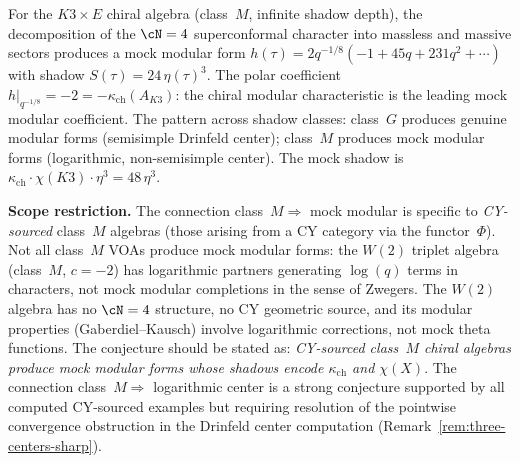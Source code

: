 \begin{remark}
\label{rem:class-m-mock-modular}
For the $K3 \times E$ chiral algebra (class~$M$, infinite shadow depth), the decomposition of the $\cN = 4$ superconformal character into massless and massive sectors produces a mock modular form $h(\tau) = 2q^{-1/8}(-1 + 45q + 231q^2 + \cdots)$ with shadow $S(\tau) = 24\,\eta(\tau)^3$. The polar coefficient $h|_{q^{-1/8}} = -2 = -\kappa_{\mathrm{ch}}(A_{K3})$: the chiral modular characteristic is the leading mock modular coefficient. The pattern across shadow classes: class~$G$ produces genuine modular forms (semisimple Drinfeld center); class~$M$ produces mock modular forms (logarithmic, non-semisimple center). The mock shadow is $\kappa_{\mathrm{ch}} \cdot \chi(K3) \cdot \eta^3 = 48\,\eta^3$.

\medskip\noindent
\textbf{Scope restriction.} The connection class~$M \Longrightarrow$ mock modular is specific to \emph{CY-sourced} class~$M$ algebras (those arising from a CY category via the functor~$\Phi$). Not all class~$M$ VOAs produce mock modular forms: the $W(2)$ triplet algebra (class~$M$, $c = -2$) has logarithmic partners generating $\log(q)$ terms in characters, not mock modular completions in the sense of Zwegers. The $W(2)$ algebra has no $\cN = 4$ structure, no CY geometric source, and its modular properties (Gaberdiel--Kausch) involve logarithmic corrections, not mock theta functions. The conjecture should be stated as: \emph{CY-sourced class~$M$ chiral algebras produce mock modular forms whose shadows encode $\kappa_{\mathrm{ch}}$ and $\chi(X)$}. The connection class~$M \Longrightarrow$ logarithmic center is a strong conjecture supported by all computed CY-sourced examples but requiring resolution of the pointwise convergence obstruction in the Drinfeld center computation (Remark~\ref{rem:three-centers-sharp}).
\end{remark}

